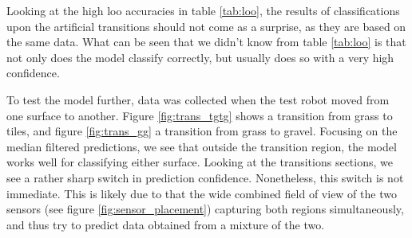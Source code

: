 Looking at the high \gls{loo} accuracies in table \ref{tab:loo}, the results of classifications upon the artificial transitions should not come as a surprise, as they are based on the same data. What can be seen that we didn't know from table \ref{tab:loo} is that not only does the model classify correctly, but usually  does so with a very high confidence. 

To test the model further, data was collected when the test robot moved from one surface to another. Figure \ref{fig:trans_tgtg} shows a transition from grass to tiles, and figure \ref{fig:trans_gg} a transition from grass to gravel. Focusing on the median filtered predictions, we see that outside the transition region, the model works well for classifying either surface. Looking at the transitions sections, we see a rather sharp switch in prediction confidence. Nonetheless, this switch is not immediate. This is likely due to that the wide combined field of view of the two sensors (see figure \ref{fig:sensor_placement}) capturing both regions simultaneously, and thus try to predict data obtained from a mixture of the two. 


